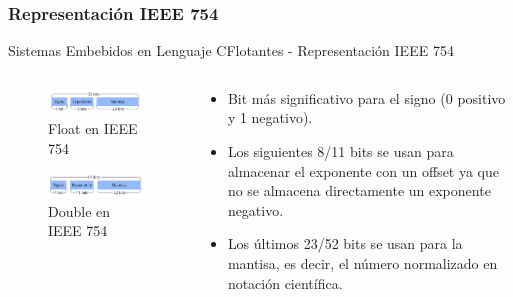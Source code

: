 \documentclass[aspectratio=169, xcolor=dvipsnames]{beamer}
\begin{document}
\subsubsection{Representación IEEE 754}
\begin{frame}{Sistemas Embebidos en Lenguaje C}{Flotantes - Representación IEEE 754}
\begin{columns}
    \begin{column}{0.5\textwidth}
    \begin{figure}
        \centering
        \includegraphics[width=0.9\linewidth]{resources/images/float_ieee_754.png}
        \caption{Float en IEEE 754}
    \end{figure}
    \begin{figure}
        \centering
        \includegraphics[width=0.9\linewidth]{resources/images/double_ieee_754.png}
        \caption{Double en IEEE 754}
    \end{figure}    
    \end{column}
    \begin{column}{0.5\textwidth}
    \begin{itemize}
        \item Bit más significativo para el signo (0 positivo y 1 negativo).
        \item Los siguientes 8/11 bits se usan para almacenar el exponente con un offset ya que no se almacena directamente un exponente negativo.
        \item Los últimos 23/52 bits se usan para la mantisa, es decir, el número normalizado en notación científica.
    \end{itemize}
    \end{column}
\end{columns}
\end{frame}
\end{document}
